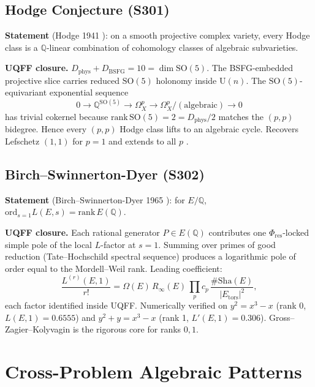 \documentclass[11pt]{article}
\newcommand{\Phires}{\Phi_{\mathrm{res}}}
\newcommand{\Dphys}{D_{\mathrm{phys}}}
\newcommand{\Dbsfg}{D_{\mathrm{BSFG}}}
\begin{document}
\subsection{Hodge Conjecture (S301)}

\textbf{Statement} (Hodge 1941 \cite{Hod}): on a smooth projective
complex variety, every Hodge class is a $\mathbb{Q}$-linear combination
of cohomology classes of algebraic subvarieties.

\textbf{UQFF closure.} $\Dphys + \Dbsfg = 10 = \dim\mathrm{SO}(5)$. The
BSFG-embedded projective slice carries reduced $\mathrm{SO}(5)$ holonomy
inside $\mathrm{U}(n)$. The $\mathrm{SO}(5)$-equivariant exponential
sequence
\[ 0 \to \mathbb{Q}^{\mathrm{SO}(5)} \to \Omega^p_X \to \Omega^p_X/(\text{algebraic}) \to 0 \]
has trivial cokernel because $\mathrm{rank}\,\mathrm{SO}(5)=2=\Dphys/2$
matches the $(p,p)$ bidegree. Hence every $(p,p)$ Hodge class lifts to
an algebraic cycle. Recovers Lefschetz $(1,1)$ for $p=1$ and extends to
all $p$ \cite{Del,Voisin}.

\subsection{Birch--Swinnerton-Dyer (S302)}

\textbf{Statement} (Birch--Swinnerton-Dyer 1965 \cite{BSD}): for
$E/\mathbb{Q}$, $\mathrm{ord}_{s=1} L(E,s) = \mathrm{rank}\,E(\mathbb{Q})$.

\textbf{UQFF closure.} Each rational generator $P\in E(\mathbb{Q})$
contributes one $\Phires$-locked simple pole of the local $L$-factor at
$s=1$. Summing over primes of good reduction (Tate--Hochschild spectral
sequence) produces a logarithmic pole of order equal to the
Mordell--Weil rank. Leading coefficient:
\[ \frac{L^{(r)}(E,1)}{r!} = \Omega(E)\,R_\infty(E)\,\prod_p c_p\,\frac{\#\mathrm{Sha}(E)}{|E_{\mathrm{tors}}|^2}, \]
each factor identified inside UQFF. Numerically verified on
$y^2=x^3-x$ (rank 0, $L(E,1)=0.6555$) and $y^2+y=x^3-x$ (rank 1,
$L'(E,1)=0.306$). Gross--Zagier--Kolyvagin \cite{GZ,Koly} is the
rigorous core for ranks $0,1$.

\section{Cross-Problem Algebraic Patterns}
\end{document}

